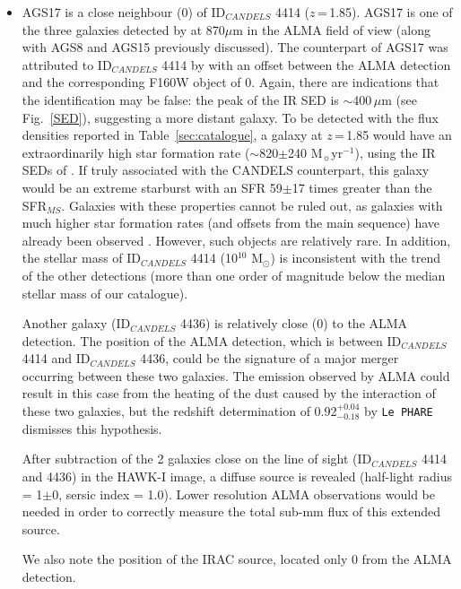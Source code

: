 \documentclass[longauth]{aa}
\begin{document}
\begin{itemize}
\item AGS17 is a close neighbour (0) of ID$_{CANDELS}$ 4414 ($z$\,=\,1.85). AGS17 is one of the three galaxies detected by \cite{Hodge2013} at 870$\mu$m in the ALMA field of view (along with AGS8 and AGS15 previously discussed). The counterpart of AGS17 was attributed to ID$_{CANDELS}$ 4414 by \cite{Wiklind2014} with an offset between the ALMA detection and the corresponding F160W object of 0. 
Again, there are indications that the identification may be false:
the peak of the IR SED is $\sim$400\,$\mu$m (see Fig.~\ref{SED}), suggesting a more distant galaxy. 
To be detected with the flux densities reported in Table~\ref{sec:catalogue}, a galaxy at $z$\,=\,1.85 would have an extraordinarily high star formation rate ($\sim$820$\pm$240 M$_\sun$yr$^{-1}$), using the IR SEDs of \cite{Schreiber2017}.
If truly associated with the CANDELS counterpart, this galaxy would be an extreme starburst with an SFR 59$\pm$17 times greater than the SFR$_{MS}$. Galaxies with these properties cannot be ruled out, as galaxies with much higher star formation rates (and offsets from the main sequence) have already been observed \cite[e.g.][]{Pope2005,Fu2013}. However, such objects are relatively rare.
In addition, the stellar mass of ID$_{CANDELS}$ 4414 (10$^{10}$ M$_{\odot}$) is inconsistent with the trend of the other detections (more than one order of magnitude below the median stellar mass of our catalogue).

Another galaxy (ID$_{CANDELS}$ 4436) is relatively close (0) to the ALMA detection. The position of the ALMA detection, which is between ID$_{CANDELS}$ 4414 and ID$_{CANDELS}$ 4436, could be the signature of a major merger occurring between these two galaxies. The emission observed by ALMA could result in this case from the heating of the dust caused by the interaction of these two galaxies, but the redshift determination of 0.92$_{-0.18}^{+0.04}$ by \texttt{Le PHARE} \citep{Arnouts1999,Ilbert2006} dismisses this hypothesis. 

After subtraction of the 2 galaxies close on the line of sight (ID$_{CANDELS}$ 4414 and 4436) in the HAWK-I image, a diffuse source is revealed (half-light radius = 1$\pm$0, sersic index = 1.0). Lower resolution ALMA observations would be needed in order to correctly measure the total sub-mm flux of this extended source.

We also note the position of the IRAC source, located only 0 from the ALMA detection.
\end{itemize}
\end{document}
